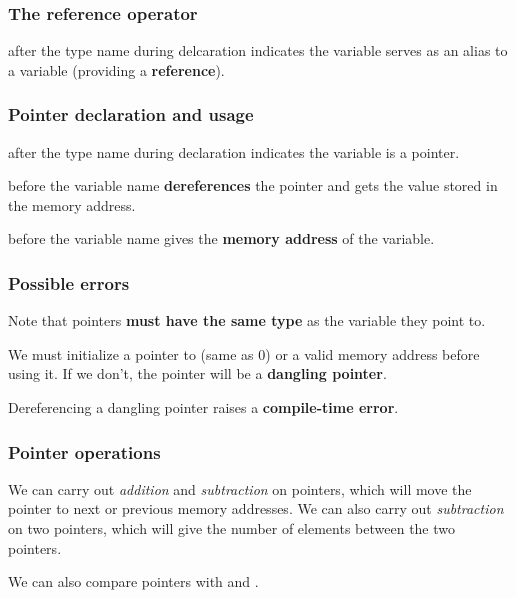 \documentclass{article}
\begin{document}
\subsubsection{The reference operator}
 after the type name during delcaration indicates the variable serves as an alias to a variable (providing a \textbf{reference}).


\subsubsection{Pointer declaration and usage}
 after the type name during declaration indicates the variable is a pointer.

 before the variable name \textbf{dereferences} the pointer and gets the value stored in the memory address.

 before the variable name gives the \textbf{memory address} of the variable.



\subsubsection{Possible errors}
Note that pointers \textbf{must have the same type} as the variable they point to.

We must initialize a pointer to  (same as 0) or a valid memory address before using it. If we don't, the pointer will be a \textbf{dangling pointer}.

Dereferencing a dangling pointer raises a \textbf{compile-time error}.

\subsubsection{Pointer operations}
We can carry out \emph{addition} and \emph{subtraction} on pointers, which will move the pointer to next or previous memory addresses. We can also carry out \emph{subtraction} on two pointers, which will give the number of elements between the two pointers.

We can also compare pointers with  and .
\end{document}
